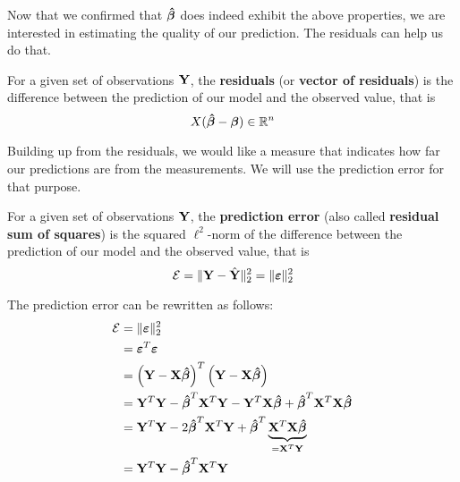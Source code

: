 Now that we confirmed that \( \boldsymbol{\hat{\beta}} \) does indeed exhibit the above properties, we are interested in estimating the quality of our prediction. The residuals can help us do that.
\begin{definition}[Residuals]
    For a given set of observations \(\mathbf{Y}\), the \textbf{residuals} (or \textbf{vector of residuals}) is the difference between the prediction of our model and the observed value, that is
    \[
        X (\boldsymbol{\hat{\beta}} - \boldsymbol{\beta}) \in \mathbb{R}^n
    \]
\end{definition}
Building up from the residuals, we would like a measure that indicates how far our predictions are from the measurements. We will use the prediction error for that purpose.
\begin{definition}
    For a given set of observations \(\mathbf{Y}\), the \textbf{prediction error} (also called \textbf{residual sum of squares}) is the squared \(\ell^2\)-norm of the difference between the prediction of our model and the observed value, that is
    \[
        \mathcal{E} = \| \mathbf{Y} - \hat{\mathbf{Y}} \|_2^2 = \| \boldsymbol{\varepsilon} \|_2^2
    \]
\end{definition}
The prediction error can be rewritten as follows:
\begin{align*}
    \mathcal{E}
     & = \| \boldsymbol{\varepsilon} \|_2^2                                                                     \\
     & = \boldsymbol{\varepsilon}^T \boldsymbol{\varepsilon}                                                                        \\
     & = \left( \mathbf{Y} - \mathbf{X} \boldsymbol{\hat{\beta}} \right)^T \left(\mathbf{Y} - \mathbf{X} \boldsymbol{\hat{\beta}}  \right)                    \\
     & = \mathbf{Y}^T \mathbf{Y} - \boldsymbol{\hat{\beta}}^T \mathbf{X}^T \mathbf{Y} - \mathbf{Y}^T \mathbf{X} \boldsymbol{\hat{\beta}} + \boldsymbol{\hat{\beta}}^T \mathbf{X}^T \mathbf{X} \boldsymbol{\hat{\beta}}          \\
     & = \mathbf{Y}^T \mathbf{Y} - 2 \boldsymbol{\hat{\beta}}^T \mathbf{X}^T \mathbf{Y} + \boldsymbol{\hat{\beta}}^T \underbrace{\mathbf{X}^T \mathbf{X} \boldsymbol{\hat{\beta}}}_{= \mathbf{X}^T \mathbf{Y}} \\
     & = \mathbf{Y}^T \mathbf{Y} - \boldsymbol{\hat{\beta}}^T \mathbf{X}^T \mathbf{Y}                                                        \\
\end{align*}



